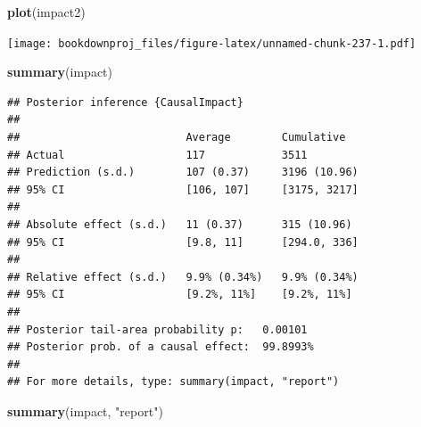 \documentclass[
]{article}
\newenvironment{Shaded}{\begin{snugshade}}{\end{snugshade}}
\newcommand{\KeywordTok}[1]{\textcolor[rgb]{0.13,0.29,0.53}{\textbf{#1}}}
\newcommand{\NormalTok}[1]{#1}
\newcommand{\StringTok}[1]{\textcolor[rgb]{0.31,0.60,0.02}{#1}}
\begin{document}
\begin{Shaded}
\begin{Highlighting}[]
\KeywordTok{plot}\NormalTok{(impact2)}
\end{Highlighting}
\end{Shaded}

\texttt{[image: bookdownproj\_files/figure-latex/unnamed-chunk-237-1.pdf]}

\begin{Shaded}
\begin{Highlighting}[]
\KeywordTok{summary}\NormalTok{(impact)}
\end{Highlighting}
\end{Shaded}

\begin{verbatim}
## Posterior inference {CausalImpact}
## 
##                          Average        Cumulative  
## Actual                   117            3511        
## Prediction (s.d.)        107 (0.37)     3196 (10.96)
## 95% CI                   [106, 107]     [3175, 3217]
##                                                     
## Absolute effect (s.d.)   11 (0.37)      315 (10.96) 
## 95% CI                   [9.8, 11]      [294.0, 336]
##                                                     
## Relative effect (s.d.)   9.9% (0.34%)   9.9% (0.34%)
## 95% CI                   [9.2%, 11%]    [9.2%, 11%] 
## 
## Posterior tail-area probability p:   0.00101
## Posterior prob. of a causal effect:  99.8993%
## 
## For more details, type: summary(impact, "report")
\end{verbatim}

\begin{Shaded}
\begin{Highlighting}[]
\KeywordTok{summary}\NormalTok{(impact, }\StringTok{"report"}\NormalTok{)}
\end{Highlighting}
\end{Shaded}
\end{document}

